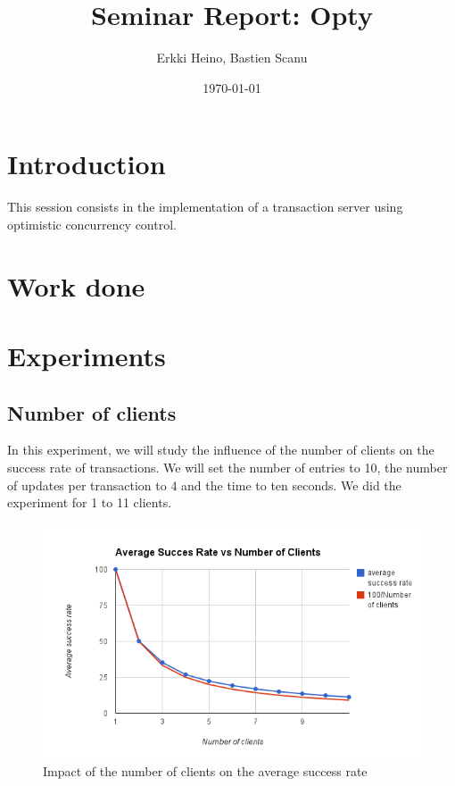 \documentclass[a4paper, 11pt]{article}
\title{Seminar Report: Opty}
\author{Erkki Heino, Bastien Scanu}
\date{\today{}}
\begin{document}
\maketitle

\section{Introduction}
This session consists in the implementation of a transaction server using optimistic concurrency control.


\section{Work done}


\section{Experiments}

\subsection{Number of clients}
In this experiment, we will study the influence of the number of clients on the success rate of transactions. We will set the number of entries to 10, the number of updates per transaction to 4 and the time to ten seconds. We did the experiment for 1 to 11 clients.

\begin{figure}[H]
\begin{center}
\includegraphics[scale=0.5]{exp1.png}
\caption{Impact of the number of clients on the average success rate}
\end{center}
\end{figure}
\end{document}
